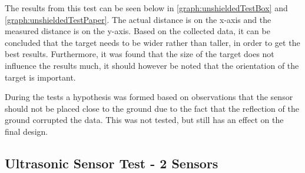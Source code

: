 
The results from this test can be seen below in
\autoref{graph:unshieldedTestBox} and \autoref{graph:unshieldedTestPaper}. The
actual distance is on the x-axis and the measured distance is on the y-axis.
Based on the collected data, it can be concluded that the target needs to be
wider rather than taller, in order to get the best results. Furthermore, it was
found that the size of the target does not influence the results much, it should
however be noted that the orientation of the target is important.





% 

During the tests a hypothesis was formed based on observations that the sensor
should not be placed close to the ground due to the fact that the reflection of
the ground corrupted the data. This was not tested, but still has an effect on the
final design. 

\subsection{Ultrasonic Sensor Test - 2 Sensors}


